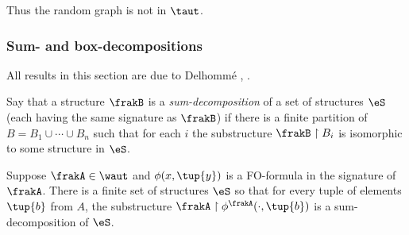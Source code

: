 Thus the random graph is not in $\taut$.

\subsubsection{Sum- and box-decompositions}

All results in this section are due to Delhomm\'e \cite{}, \cite{Delh01a}.
\begin{definition} 
Say that a structure $\frakB$ is a {\em sum-decomposition} of a set of structures
$\eS$ (each having the same signature as $\frakB$) if there is a finite partition of $B
= B_1 \cup \cdots \cup B_n$ such that for each $i$ the substructure $\frakB
\restriction B_i$ is isomorphic to some structure in $\eS$.
\end{definition}

\begin{theorem} \label{thm:sumaug}
Suppose $\frakA \in \waut$ and $\phi(x,\tup{y})$ is a FO-formula in the signature of $\frakA$.
There is a finite set of
structures $\eS$ so that for every tuple of elements $\tup{b}$ from $A$, the
substructure ${\frakA} \restriction \phi^{\frakA}(\cdot,\tup{b})$ is a sum-decomposition
of $\eS$.
\end{theorem}

